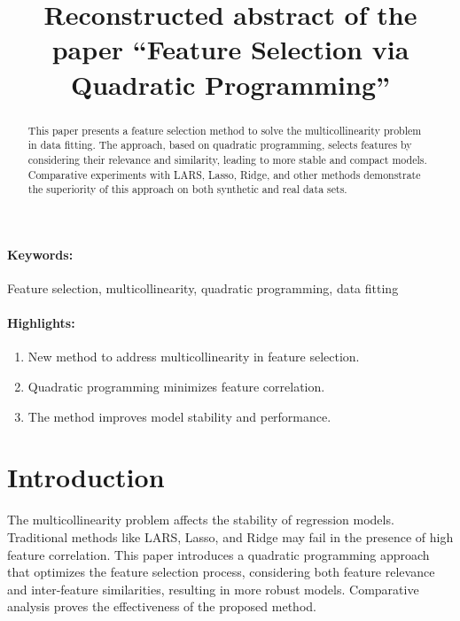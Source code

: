 \documentclass[12pt]{article}
\title{Reconstructed abstract of the paper ``Feature Selection via Quadratic Programming''}
\date{}
\begin{document}
\maketitle

\begin{abstract}
This paper presents a feature selection method to solve the multicollinearity problem in data fitting. The approach, based on quadratic programming, selects features by considering their relevance and similarity, leading to more stable and compact models. Comparative experiments with LARS, Lasso, Ridge, and other methods demonstrate the superiority of this approach on both synthetic and real data sets.
\end{abstract}
\paragraph{Keywords:} Feature selection, multicollinearity, quadratic programming, data fitting

\paragraph{Highlights:}
\begin{enumerate}
    \item New method to address multicollinearity in feature selection.
    \item Quadratic programming minimizes feature correlation.
    \item The method improves model stability and performance.
\end{enumerate}

\section{Introduction}
The multicollinearity problem affects the stability of regression models. Traditional methods like LARS, Lasso, and Ridge may fail in the presence of high feature correlation. This paper introduces a quadratic programming approach that optimizes the feature selection process, considering both feature relevance and inter-feature similarities, resulting in more robust models. Comparative analysis proves the effectiveness of the proposed method.



\end{document}
